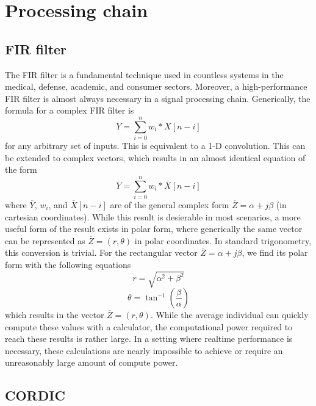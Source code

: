 \documentclass[11pt]{report}
\begin{document}
\section{Processing chain}
\subsection{FIR filter}\label{FIRtheory}

The FIR filter is a fundamental technique used in countless systems in the medical, defense, academic, and consumer sectors. Moreover, a high-performance FIR filter is almost always necessary in a signal processing chain. Generically, the formula for a complex FIR filter is
\begin{equation}
    Y = \sum_{i=0}^{n}w_i * X[n - i]
\end{equation}
for any arbitrary set of inputs. This is equivalent to a 1-D convolution. This can be extended to complex vectors, which results in an almost identical equation of the form
\begin{equation}
	\overline{Y} = \sum_{i=0}^{n} w_i * \overline{X}[n-i]
\end{equation}
where $\overline{Y}$, $w_i$, and $\overline{X}[n-i]$ are of the general complex form $\overline{Z} = \alpha + j \beta$ (in cartesian coordinates). While this result is desierable in most scenarios, a more useful form of the result exists in polar form, where generically the same vector can be represented as $\overline{Z} = (r, \theta)$ in polar coordinates. In standard trigonometry, this conversion is trivial. For the rectangular vector $\overline{Z} = \alpha + j \beta$, we find its polar form with the following equations
\begin{equation}
	r = \sqrt{\alpha^2 + \beta^2}
\end{equation}
\begin{equation}
	\theta = \tan^{-1}\left({\frac{\beta}{\alpha}}\right)
\end{equation}
which results in the vector $\overline{Z} = (r, \theta)$. While the average individual can quickly compute these values with a calculator, the computational power required to reach these results is rather large. In a setting where realtime performance is necessary, these calculations are nearly impossible to achieve or require an unreasonably large amount of compute power.

\subsection{CORDIC}\label{cordicTheory}
\end{document}
